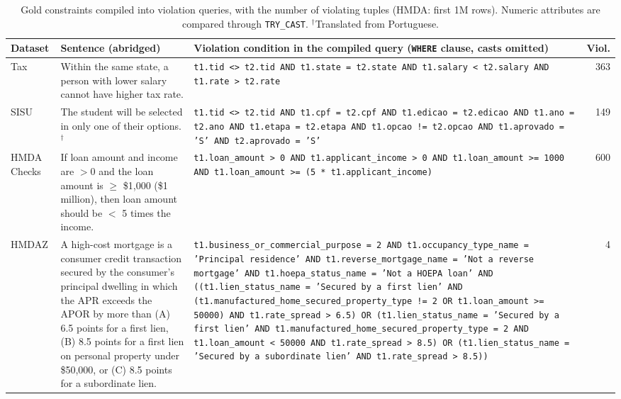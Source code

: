 \begin{table}[t]
  \centering
  \footnotesize
  \setlength{\tabcolsep}{4pt}
  \begin{tabular}{>{\raggedright\arraybackslash}p{1.6cm}>{\raggedright\arraybackslash}p{4.6cm}>{\raggedright\arraybackslash}p{9.0cm}r}
    \toprule
    \textbf{Dataset} & \textbf{Sentence (abridged)} & \textbf{Violation condition in the compiled query (\texttt{WHERE} clause, casts omitted)} & \textbf{Viol.} \\
    \midrule
    Tax & Within the same state, a person with lower salary cannot have higher tax rate. & \texttt{t1.tid <> t2.tid AND t1.state = t2.state AND t1.salary < t2.salary AND t1.rate > t2.rate} & 363 \\
    SISU & The student will be selected in only one of their options.$^{\dagger}$ & \texttt{t1.tid <> t2.tid AND t1.cpf = t2.cpf AND t1.edicao = t2.edicao AND t1.ano = t2.ano AND t1.etapa = t2.etapa AND t1.opcao != t2.opcao AND t1.aprovado = 'S' AND t2.aprovado = 'S'} & 149 \\
    HMDA Checks & If loan amount and income are $>0$ and the loan amount is $\geq$ \$1,000 (\$1 million), then loan amount should be $<$ 5 times the income. & \texttt{t1.loan\_amount > 0 AND t1.applicant\_income > 0 AND t1.loan\_amount >= 1000 AND t1.loan\_amount >= (5 * t1.applicant\_income)} & 600 \\
    HMDAZ & A high-cost mortgage is a consumer credit transaction secured by the consumer's principal dwelling in which the APR exceeds the APOR by more than (A) 6.5 points for a first lien, (B) 8.5 points for a first lien on personal property under \$50,000, or (C) 8.5 points for a subordinate lien. & \texttt{t1.business\_or\_commercial\_purpose = 2 AND t1.occupancy\_type\_name = 'Principal residence' AND t1.reverse\_mortgage\_name = 'Not a reverse mortgage' AND t1.hoepa\_status\_name = 'Not a HOEPA loan' AND ((t1.lien\_status\_name = 'Secured by a first lien' AND (t1.manufactured\_home\_secured\_property\_type != 2 OR t1.loan\_amount >= 50000) AND t1.rate\_spread > 6.5) OR (t1.lien\_status\_name = 'Secured by a first lien' AND t1.manufactured\_home\_secured\_property\_type = 2 AND t1.loan\_amount < 50000 AND t1.rate\_spread > 8.5) OR (t1.lien\_status\_name = 'Secured by a subordinate lien' AND t1.rate\_spread > 8.5))} & 4 \\
    \bottomrule
  \end{tabular}
  \caption{Gold constraints compiled into violation queries, with the number of violating tuples (HMDA: first 1M rows). Numeric attributes are compared through \texttt{TRY\_CAST}. $^{\dagger}$Translated from Portuguese.}
  \label{tab:sql-examples}
\end{table}

